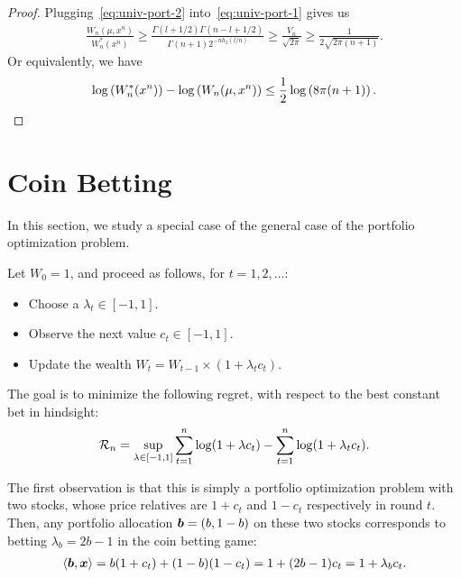 \begin{proof}
        Plugging~\eqref{eq:univ-port-2} into~\eqref{eq:univ-port-1} gives us 
        \begin{align}
            \frac{W_n(\mu, x^n)}{W_n^*(x^n)} \geq \frac{\Gamma(l+1/2) \Gamma(n-l+1/2)}{\Gamma(n+1) 2^{-n h_2(l/n)}}  \geq \frac{V_n}{\sqrt{2\pi}} \geq \frac{1}{2 \sqrt{2 \pi (n+1)}}. 
        \end{align}
        Or equivalently, we have 
        \begin{align}
             \log \left( W_n^*(x^n) \right) -  \log \left( W_n(\mu, x^n) \right)   \leq \frac{1}{2} \log \left( 8\pi(n+1) \right). 
        \end{align}
    \end{proof}
    

\section{Coin Betting}
\label{sec:coin-betting}
    In this section, we study a special case of the general case of the portfolio optimization problem. 
    \begin{definition}
        \label{def:coin-betting-game} Let $W_0=1$, and proceed as follows, for $t=1, 2, \ldots:$
        \begin{itemize}
            \item Choose a $\lambda_t \in [-1,1]$. 
            \item Observe the next value $c_t \in [-1,1]$.  
            \item Update the wealth $W_t = W_{t-1} \times (1 + \lambda_t c_t)$. 
        \end{itemize}
        The goal is to minimize the following regret, with respect to the best constant bet in hindsight: 
        \begin{align}
            \mathcal{R}_n =  \sup_{\lambda \in [-1,1]} \sum_{t=1}^n \log (1 + \lambda c_t) - \sum_{t=1}^n \log( 1 + \lambda_t c_t). 
        \end{align}
    \end{definition}
    The first observation is that this is simply a portfolio optimization problem with two stocks, whose price relatives are $1+c_t$ and $1-c_t$ respectively in round $t$. Then, any portfolio allocation $\boldsymbol{b} = (b, 1-b)$ on these two stocks corresponds to betting $\lambda_b = 2b - 1$ in the coin betting game: 
    \begin{align}
        \langle \boldsymbol{b}, \boldsymbol{x} \rangle =  b (1+c_t) + (1-b)(1-c_t) = 1 + (2b - 1) c_t = 1 + \lambda_b c_t. 
    \end{align}

